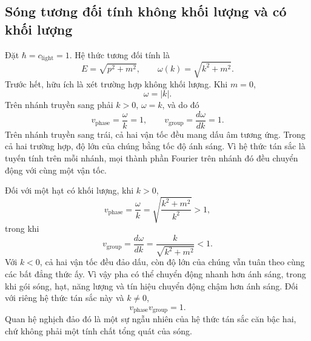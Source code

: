 \subsection{Sóng tương đối tính không khối lượng và có khối lượng}

\begin{classroomqa}
\end{classroomqa}

\begin{classroomqa}
\end{classroomqa}

Đặt \(\hbar=c_{\mathrm{light}}=1\). Hệ thức tương đối tính là
\begin{equation}
E=\sqrt{p^2+m^2},
\qquad
\omega(k)=\sqrt{k^2+m^2}.
\end{equation}
Trước hết, hữu ích là xét trường hợp không khối lượng. Khi \(m=0\),
\begin{equation}
\omega=|k|.
\end{equation}
Trên nhánh truyền sang phải \(k>0\), \(\omega=k\), và do đó
\begin{equation}
v_{\mathrm{phase}}=\frac{\omega}{k}=1,
\qquad
v_{\mathrm{group}}=\frac{d\omega}{dk}=1.
\end{equation}
Trên nhánh truyền sang trái, cả hai vận tốc đều mang dấu âm tương ứng. Trong cả hai trường hợp, độ lớn của chúng bằng tốc độ ánh sáng. Vì hệ thức tán sắc là tuyến tính trên mỗi nhánh, mọi thành phần Fourier trên nhánh đó đều chuyển động với cùng một vận tốc.

Đối với một hạt có khối lượng, khi \(k>0\),
\begin{equation}
v_{\mathrm{phase}}
=\frac{\omega}{k}
=\sqrt{\frac{k^2+m^2}{k^2}}>1,
\end{equation}
trong khi
\begin{equation}
v_{\mathrm{group}}
=\frac{d\omega}{dk}
=\frac{k}{\sqrt{k^2+m^2}}<1.
\end{equation}
Với \(k<0\), cả hai vận tốc đều đảo dấu, còn độ lớn của chúng vẫn tuân theo cùng các bất đẳng thức ấy. Vì vậy pha có thể chuyển động nhanh hơn ánh sáng, trong khi gói sóng, hạt, năng lượng và tín hiệu chuyển động chậm hơn ánh sáng. Đối với riêng hệ thức tán sắc này và \(k\neq0\),
\begin{equation}
v_{\mathrm{phase}}v_{\mathrm{group}}=1.
\end{equation}
Quan hệ nghịch đảo đó là một sự ngẫu nhiên của hệ thức tán sắc căn bậc hai, chứ không phải một tính chất tổng quát của sóng.

